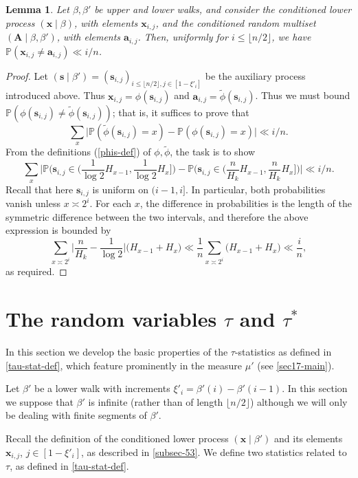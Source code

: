 \documentclass[11pt,reqno]{amsart}
\numberwithin{equation}{section}
\newtheorem{lemma}[theorem]{Lemma}
\theoremstyle{definition}
\theoremstyle{remark}
\newcommand{\mb}{\mathbb}
\newcommand{\mbf}{\mathbf}
\renewcommand{\le}{\leqslant}
\begin{document}
\begin{lemma}\label{s-couple}
Let $\beta, \beta'$ be upper and lower walks, and consider the conditioned lower process $(\mbf{x} \mid \beta)$, with elements $\mbf{x}_{i,j}$, and the conditioned random multiset $(\mbf{A} \mid \beta,\beta')$, with elements $\mbf{a}_{i,j}$. Then, uniformly for $i \le \lfloor n/2\rfloor$, we have $\mb{P}(\mbf{x}_{i,j} \neq \mbf{a}_{i,j})  \ll i/n$.\end{lemma}
\begin{proof}
Let $(\mbf{s} \mid \beta') = (\mbf{s}_{i,j})_{i \le \lfloor n/2\rfloor, j \in [1 - \xi'_i]}$ be the auxiliary process introduced above. Thus $\mbf{x}_{i,j} = \phi(\mbf{s}_{i,j})$ and $\mbf{a}_{i, j} = \tilde\phi(\mbf{s}_{i,j})$. Thus we must bound $\mb{P}(\phi(\mbf{s}_{i,j}) \ne \tilde\phi(\mbf{s}_{i,j}))$; that is, it suffices to prove that \[ \sum_x \big|\mb{P}(\tilde\phi(\mbf{s}_{i,j}) = x) - \mb{P}(\phi(\mbf{s}_{i,j}) = x)\big|  \ll i/n.\] From the definitions (\cref{phis-def}) of $\phi, \tilde\phi$, the task is to show
\[ \sum_x \Big| \mb{P} \big( \mbf{s}_{i,j} \in (\frac{1}{\log 2} H_{x-1}, \frac{1}{\log 2}H_x] \big) - \mb{P} \big( \mbf{s}_{i,j} \in (\frac{n}{H_k} H_{x-1}, \frac{n}{H_k}H_x] \big)\Big| \ll i/n. \]
Recall that here $\mbf{s}_{i,j}$ is uniform on $(i-1, i]$. In particular, both probabilities vanish unless $x \asymp 2^i$. For each $x$, the difference in probabilities is the length of the symmetric difference between the two intervals, and therefore the above expression is bounded by
\[ \sum_{x \asymp 2^i} \Big|\frac{n}{H_k} - \frac{1}{\log 2}\Big| \big( H_{x - 1} + H_x\big) \ll \frac{1}{n} \sum_{x \asymp 2^i} \big(H_{x-1} + H_x\big) \ll \frac{i}{n}, \] as required.
\end{proof}

\section{The random variables \texorpdfstring{$\tau$}{} and \texorpdfstring{$\tau^*$}{}}
\label{tau-sec}
In this section we develop the basic properties of the $\tau$-statistics as defined in \cref{tau-stat-def}, which feature prominently in the measure $\mu'$ (see \cref{sec17-main}). 
 
Let $\beta'$ be a lower walk with increments $\xi'_i = \beta'(i) - \beta'(i-1)$. In this section we suppose that $\beta'$ is infinite (rather than of length $\lfloor n/2\rfloor$) although we will only be dealing with finite segments of $\beta'$.

Recall the definition of the conditioned lower process $(\mbf{x} \mid \beta')$ and its elements $\mbf{x}_{i,j}$, $j \in [1 - \xi'_i]$, as described in \cref{subsec-53}. We define two statistics related to $\tau$, as defined in \cref{tau-stat-def}.
\end{document}
